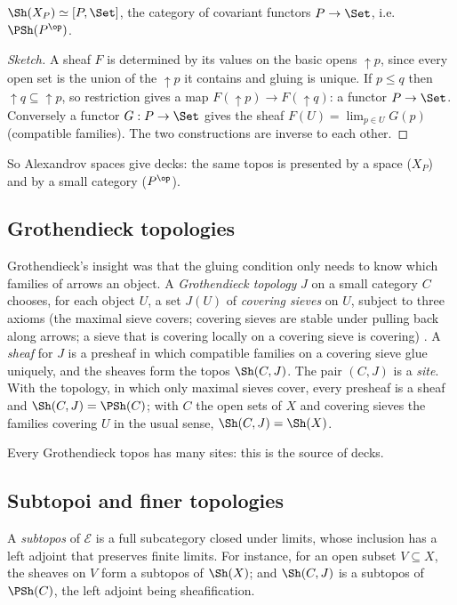 \begin{proposition}\label{prop:alexandrov}
$\Sh(X_P)\simeq[P,\Set]$, the category of covariant functors $P\to\Set$, i.e.\ $\PSh(P^{\op})$.
\end{proposition}

\begin{proof}[Sketch]
A sheaf $F$ is determined by its values on the basic opens $\uparrow p$, since every open set is the union of the $\uparrow p$ it contains and gluing is unique. If $p\le q$ then $\uparrow q\subseteq\uparrow p$, so restriction gives a map $F(\uparrow p)\to F(\uparrow q)$: a functor $P\to\Set$. Conversely a functor $G : P\to\Set$ gives the sheaf $F(U) = \lim_{p\in U}G(p)$ (compatible families). The two constructions are inverse to each other.
\end{proof}

So Alexandrov spaces give decks: the same topos is presented by a space ($X_P$) and by a small category ($P^{\op}$).

\subsection{Grothendieck topologies}

Grothendieck's insight was that the gluing condition only needs to know which families of arrows  an object. A \emph{Grothendieck topology} $J$ on a small category $C$ chooses, for each object $U$, a set $J(U)$ of \emph{covering sieves} on $U$, subject to three axioms (the maximal sieve covers; covering sieves are stable under pulling back along arrows; a sieve that is covering locally on a covering sieve is covering) \cite[slide 34]{caramello-mines}. A \emph{sheaf} for $J$ is a presheaf in which compatible families on a covering sieve glue uniquely, and the sheaves form the topos $\Sh(C,J)$. The pair $(C,J)$ is a \emph{site}. With the  topology, in which only maximal sieves cover, every presheaf is a sheaf and $\Sh(C,J) = \PSh(C)$; with $C$ the open sets of $X$ and covering sieves the families covering $U$ in the usual sense, $\Sh(C,J) = \Sh(X)$.

Every Grothendieck topos has many sites: this is the source of decks.

\subsection{Subtopoi and finer topologies}

A \emph{subtopos} of $\mathcal E$ is a full subcategory closed under limits, whose inclusion has a left adjoint that preserves finite limits. For instance, for an open subset $V\subseteq X$, the sheaves on $V$ form a subtopos of $\Sh(X)$; and $\Sh(C,J)$ is a subtopos of $\PSh(C)$, the left adjoint being sheafification.

